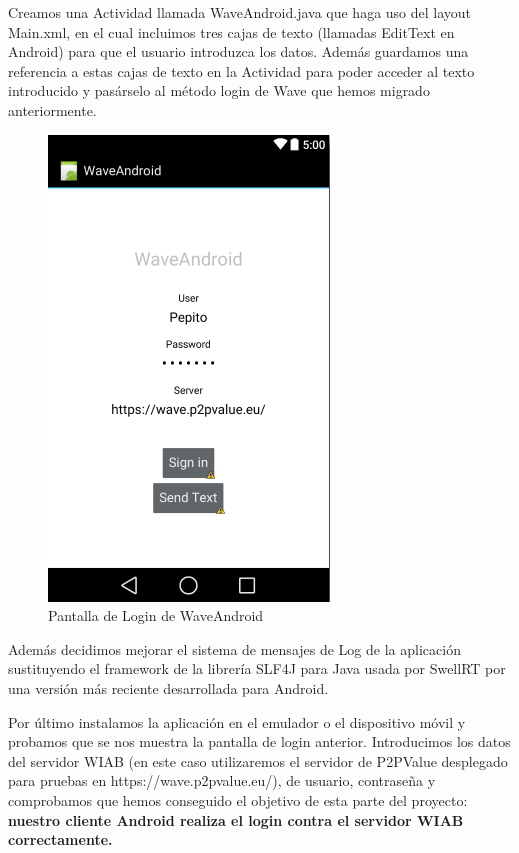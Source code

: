     Creamos una Actividad llamada WaveAndroid.java que haga uso del layout Main.xml, en el cual incluimos tres cajas de texto (llamadas EditText en Android) para que el usuario introduzca los datos. Además guardamos una referencia a estas cajas de texto en la Actividad para poder acceder al texto introducido y pasárselo al método login de Wave que hemos migrado anteriormente.
    
    	\begin{figure}[H]
      \centering
	\includegraphics[keepaspectratio, scale=0.6]{Media/Captures/waveAndroidLogin.png}
      \caption{Pantalla de Login de WaveAndroid}
      \label{fig:android_waveLogin}
    \end{figure}
    
    Además decidimos mejorar el sistema de mensajes de Log de la aplicación sustituyendo el framework de la librería SLF4J para Java usada por SwellRT por una versión más reciente desarrollada para Android\cite{ref:slf4j_android}.
        
    Por último instalamos la aplicación en el emulador o el dispositivo móvil y probamos que se nos muestra la pantalla de login anterior. Introducimos los datos del servidor WIAB (en este caso utilizaremos el servidor de P2PValue desplegado para pruebas en https://wave.p2pvalue.eu/), de usuario, contraseña y comprobamos que hemos conseguido el objetivo de esta parte del proyecto: \textbf{nuestro cliente Android realiza el login contra el servidor WIAB correctamente.} 
     
